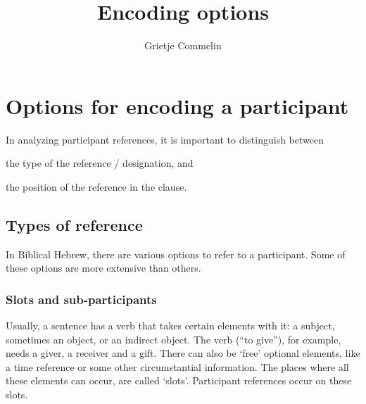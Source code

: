 \documentclass{report}
\title{Encoding options}
\author{Grietje Commelin}
\newcommand{\hebr}[1]{\cjRL{#1}}
\begin{document}
\maketitle


\section{Options for encoding a participant}

In analyzing participant references, it is important to distinguish between \\
\begin{enumerate*}[label=\itshape\alph*\upshape)]
\item the type of the reference / designation, and \\
\item the position of the reference in the clause.
\end{enumerate*}

\subsection{Types of reference}
In Biblical Hebrew, there are various options to refer to a participant. Some of these options are more extensive than others.


\subsubsection{Slots and sub-participants}
Usually, a sentence has a verb that takes certain elements with it: a subject, sometimes an object, or an indirect object. The verb \hebr{NTN} (``to give''), for example, needs a giver, a receiver and a gift. There can also be `free' optional elements, like a time reference or some other circumstantial information. The places where all these elements can occur, are called `slots'. Participant references occur on these slots.
\end{document}
